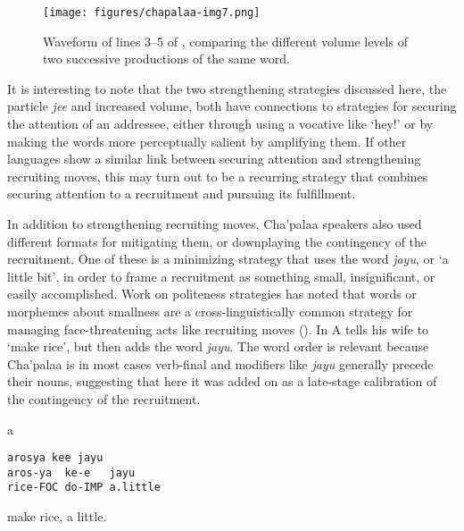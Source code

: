 \documentclass[output=paper]{langsci/langscibook}
\begin{document}
\begin{figure}
\caption{Waveform of lines 3--5 of , comparing the different volume levels of two successive productions of the same word.}
\texttt{[image: figures/chapalaa-img7.png]}
\label{fig:floyd:5}
\end{figure}

It is interesting to note that the two strengthening strategies discussed here, the particle \textit{jee} and increased volume, both have connections to strategies for securing the attention of an addressee, either through using a vocative like ‘hey!’ or by making the words more perceptually salient by amplifying them. If other languages show a similar link between securing attention and strengthening recruiting moves, this may turn out to be a recurring strategy that combines securing attention to a recruitment and pursuing its fulfillment.

In addition to strengthening recruiting moves, Cha'palaa speakers also used different formats for mitigating them, or downplaying the contingency of the recruitment. One of these is a minimizing strategy that uses the word \textit{jayu}, or ‘a little bit’, in order to frame a recruitment as something small, insignificant, or easily accomplished. Work on politeness strategies has noted that words or morphemes about smallness are a cross-linguistically common strategy for managing face-threatening acts like recruiting moves (\citealt{BrownLevinson1987}). In  A tells his wife to ‘make rice’, but then adds the word \textit{jayu}. The word order is relevant because Cha'palaa is in most cases verb-final and modifiers like \textit{jayu} generally precede their nouns, suggesting that here it was added on as a late-stage calibration of the contingency of the recruitment.

\newpage
{}\vspace{-1mm}
%
\begin{mdframednoverticalspace}[style=firstfoc]
\begin{transbox}{1}{a}
\begin{verbatim}
arosya kee jayu
aros-ya  ke-e   jayu
rice-FOC do-IMP a.little
\end{verbatim}
 make rice, a little.
\end{transbox}
\end{mdframednoverticalspace}
%
\begin{mdframednoverticalspace}[style=firstfoc]
\end{mdframednoverticalspace}
\end{document}

